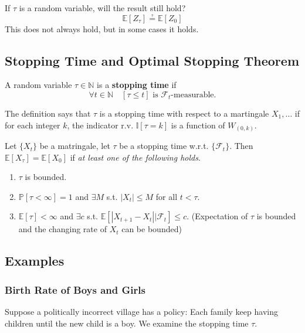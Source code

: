         If $\tau$ is a random variable, will the result still hold?
        \[\mathbb{E}[Z_{\tau}] \questeq \mathbb{E}[Z_0]\]
        This does not always hold, but in some cases it holds.

    \subsection{Stopping Time and Optimal Stopping Theorem}
        \begin{definition}\label{Def:StoppingTime}
            A random variable $\tau \in \mathbb{N}$ is a \textbf{stopping time} if
            \[ \forall t \in \mathbb{N} \quad [\tau \le t] \text{ is $\mathcal{F}_t$-measurable.} \]
        \end{definition}
        \begin{remark}
            The definition says that $\tau$ is a stopping time with respect to a martingale $X_1,\dots$ if for each integer $k$, the indicator r.v. $\mathbb{I}[\tau = k]$ is a function of $W_{(0,k)}$.
        \end{remark}

        \begin{theorem}\label{Thm:OptimalStoppingTheorem}
            Let $\{X_t\}$ be a matringale, let $\tau$ be a stopping time w.r.t. $\{\mathcal{F}_t\}$. Then $\mathbb{E}[X_{\tau}] = \mathbb{E}[X_0]$ if \emph{at least one of the following holds}.
            \begin{enumerate}
                \item $\tau$ is bounded.
                \item $\mathbb{P}[\tau < \infty] = 1$ and $\exists M$ s.t. $|X_t| \le M$ for all $t < \tau$.
                \item $\mathbb{E}[\tau] < \infty$ and $\exists c$ s.t. $\mathbb{E}[|X_{t+1} - X_{t}||\mathcal{F}_t] \le c$. (Expectation of $\tau$ is bounded and the changing rate of $X_t$ can be bounded)
            \end{enumerate}
        \end{theorem}

    \subsection{Examples}
        \subsubsection{Birth Rate of Boys and Girls}
            Suppose a politically incorrect village has a policy: Each family keep having children until the new child is a boy. We examine the stopping time $\tau$.


